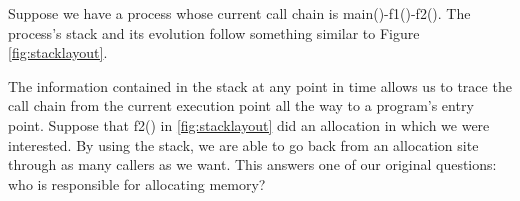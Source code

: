 Suppose we have a process whose current call chain is main()-f1()-f2(). The process's stack and its evolution follow something similar to Figure \ref{fig:stacklayout}.

The information contained in the stack at any point in time allows us to trace the call chain from the current execution point all the way to a program's entry point. Suppose that f2() in \ref{fig:stacklayout} did an allocation in which we were interested. By using the stack, we are able to go back from an allocation site through as many callers as we want. This answers one of our original questions: who is responsible for allocating memory?

